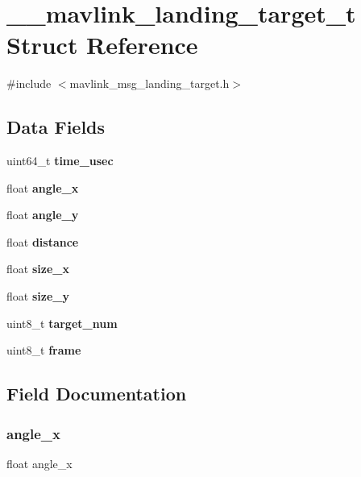 \section{\+\_\+\+\_\+mavlink\+\_\+landing\+\_\+target\+\_\+t Struct Reference}
\label{struct____mavlink__landing__target__t}


{\ttfamily \#include $<$mavlink\+\_\+msg\+\_\+landing\+\_\+target.\+h$>$}

\subsection*{Data Fields}
\begin{DoxyCompactItemize}
\item 
uint64\+\_\+t \textbf{ time\+\_\+usec}
\item 
float \textbf{ angle\+\_\+x}
\item 
float \textbf{ angle\+\_\+y}
\item 
float \textbf{ distance}
\item 
float \textbf{ size\+\_\+x}
\item 
float \textbf{ size\+\_\+y}
\item 
uint8\+\_\+t \textbf{ target\+\_\+num}
\item 
uint8\+\_\+t \textbf{ frame}
\end{DoxyCompactItemize}


\subsection{Field Documentation}
\mbox{\label{struct____mavlink__landing__target__t_abca9b3820b0c2fe325698e47c01346e3}} 
\subsubsection{angle\+\_\+x}
{\footnotesize\ttfamily float angle\+\_\+x}

\mbox{\label{struct____mavlink__landing__target__t_a82d5ce35943d137ac4fb7c8792c851bc}} 
